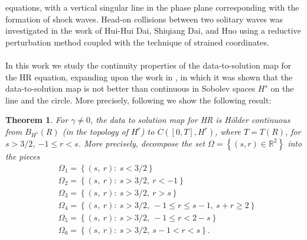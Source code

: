 \documentclass[12pt,reqno]{amsart}
\numberwithin{equation}{section}  %
\numberwithin{figure}{section}
\newcommand{\rr}{\mathbb{R}}
\newtheorem{theorem}{Theorem}[section]
\begin{document}
equations, with a vertical singular line in the phase plane corresponding with the 
formation of shock waves. Head-on collisions between two solitary 
waves was investigated in the work of Hui-Hui Dai, 
Shiqiang Dai, and Huo \cite{Dai_2000_Head-on-collisi} using a reductive 
perturbation method coupled with the technique of strained coordinates. 
\\
\\
In this work we study the continuity properties of the data-to-solution map for
the HR 
equation, expanding upon the work in \cite{Karapetyan:2010fk}, in which it was
shown that the data-to-solution map is not better than continuous in Sobolev
spaces $H^{s}$ on the line
and the circle. More precisely, following \cite{Chen:2011fk} we show the
following result:
%
%
\begin{theorem}
For $\gamma \neq 0$, the
data to solution map for HR is H\"older continuous from $B_{H^{s}}(R)$ (in
the topology of $H^{r}$) to $C([0, T], H^{r})$, where $T = T(R)$, for $s >
3/2$, $-1 \le r < s$. More
precisely, decompose the set $\Omega = \left\{ (s, r) \in \rr^{2}  \right\}$
into the pieces
  \begin{equation*}
  \begin{split}
    & \Omega_{1} = \left\{ (s, \ r):  \ s < 3/2 \right\}
    \\
    & \Omega_{2} = \left\{ (s, \ r):
     \ s>3/2, \ r < -1  \right\}
    \\
    & \Omega_{3} = \left\{ (s, \ r):
     \ s>3/2, \ r > s  \right\}
    \\
    & \Omega_{4} = \left\{ (s, \ r):
     \ s>3/2, \ -1 \le r \le s-1, \ s + r \ge 2  \right\}
    \\
    & \Omega_{5} = \left\{ (s, \ r):
     \ s>3/2, \ -1 \le r < 2-s \right\}
    \\
    & \Omega_{6} = \left\{ (s, \ r):
    \  s>3/2, \  s-1 < r < s  \right\}.
    \end{split}
\end{equation*}
\label{thm:main-thm}
\end{theorem}
%
\end{document}

